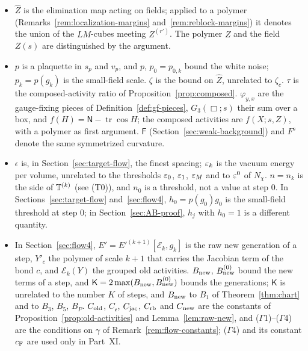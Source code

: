 \begin{remark}
\begin{itemize}
\item $\hat Z$ is the elimination map acting on fields; applied to a polymer (Remarks~\ref{rem:localization-margins} and~\ref{rem:reblock-margins}) it denotes the union of the $LM$-cubes meeting $Z^{(r')}$. The polymer $Z$ and the field $Z(s)$ are distinguished by the argument.
\item $p$ is a plaquette in $s_p$ and $v_p$, and $p$, $p_0=p_{0,k}$ bound the white noise; $p_k=p(g_k)$ is the small-field scale. $\zeta$ is the bound on $\hat Z$, unrelated to $\zeta_c$. $\tau$ is the composed-activity ratio of Proposition~\ref{prop:composed}. $\varphi_{y,x}$ are the gauge-fixing pieces of Definition~\ref{def:gf-pieces}, $G_3(\Box;s)$ their sum over a box, and $f(H)=\mathsf N-\operatorname{tr}\cos H$; the composed activities are $f(X;s,Z)$, with a polymer as first argument. $\mathsf F$ (Section~\ref{sec:weak-background}) and $F^s$ denote the same symmetrized curvature.
\item $\epsilon$ is, in Section~\ref{sec:target-flow}, the finest spacing; $\varepsilon_k$ is the vacuum energy per volume, unrelated to the thresholds $\varepsilon_0$, $\varepsilon_1$, $\varepsilon_M$ and to $\varepsilon^0$ of $N_\chi$. $n=n_k$ is the side of $\mathbb T^{(k)}$ (see (T0)), and $n_0$ is a threshold, not a value at step $0$. In Sections~\ref{sec:target-flow} and~\ref{sec:flow4}, $h_0=p(g_0)g_0$ is the small-field threshold at step $0$; in Section~\ref{sec:AB-proof}, $h_j$ with $h_0=1$ is a different quantity.
\item In Section~\ref{sec:flow4}, $E'=E'^{(k+1)}[\mathcal E_k,g_k]$ is the raw new generation of a step, $Y'_c$ the polymer of scale $k+1$ that carries the Jacobian term of the bond $c$, and $\mathcal E_k(Y)$ the grouped old activities. $B_{\rm new}$, $B^{(0)}_{\rm new}$ bound the new terms of a step, and $\mathsf K=2\max(B_{\rm new},B^{(0)}_{\rm new})$ bounds the generations; $\mathsf K$ is unrelated to the number $K$ of steps, and $B_{\rm new}$ to $B_1$ of Theorem~\ref{thm:chart} and to $B_3$, $B_5$, $B_P$. $C_{\rm old}$, $C_{\mathfrak e}$, $C_{\rm jac}$, $C_{\rm rb}$ and $C_{\rm new}$ are the constants of Proposition~\ref{prop:old-activities} and Lemma~\ref{lem:raw-new}, and ($\Gamma$1)--($\Gamma$4) are the conditions on $\gamma$ of Remark~\ref{rem:flow-constants}; ($\Gamma$4) and its constant $c_{\rm F}$ are used only in Part~XI.

\end{itemize}
\end{remark}
